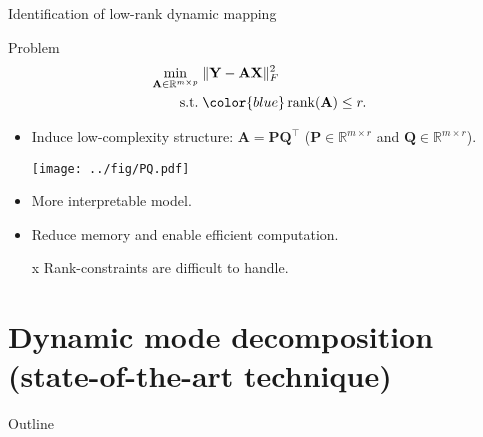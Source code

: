 \documentclass[10pt]{beamer}
\newcommand{\red}{\color{red}}
\newcommand{\blue}{\color{blue}}
\newcommand{\bX}{\mathbf{X}}
\newcommand{\bY}{\mathbf{Y}}
\newcommand{\bA}{\mathbf{A}}
\newcommand{\bP}{\mathbf{P}}
\newcommand{\bQ}{\mathbf{Q}}
\newcommand{\rank}{\mathop{\textrm{\textup{rank}}}}
\newcommand{\st}{\mathop{\textrm{\textup{s.t.}}}}
\begin{document}
\begin{frame}{Identification of low-rank dynamic mapping}
  \begin{block}{Problem}
    \vspace{-0.15in}
    \begin{align*}
      \min_{\bA\in\mathbb{R}^{m\times p}}\;& \Vert \bY - \bA \bX \Vert_F^2\\
      \st\;&{\blue \rank(\bA)\leq r.}
    \end{align*}
  \end{block}
  \begin{itemize}
  \item Induce low-complexity {\blue structure}: $\bA=\bP\bQ^\top$ ($\bP\in\mathbb{R}^{m\times r}$ and $\bQ\in\mathbb{R}^{m\times r}$).
    \begin{center}\texttt{[image: ../fig/PQ.pdf]}\end{center}
  \item {\blue More interpretable model}. 
    \vspace{0.1in}
  \item {\blue Reduce memory and enable efficient computation}.
    \vspace{0.1in}
  \item[x] Rank-constraints are {\red difficult to handle}.
  \end{itemize}
\end{frame}

\section{Dynamic mode decomposition (state-of-the-art technique)}
\begin{frame}{Outline}
  \tableofcontents[currentsection]
\end{frame}
\end{document}
